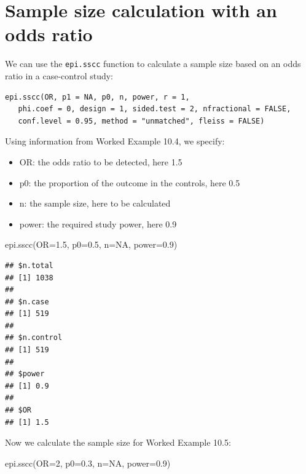 \documentclass[
]{memoir}
\newenvironment{Shaded}{\begin{snugshade}}{\end{snugshade}}
\newcommand{\AttributeTok}[1]{\textcolor[rgb]{0.77,0.63,0.00}{#1}}
\newcommand{\ConstantTok}[1]{\textcolor[rgb]{0.00,0.00,0.00}{#1}}
\newcommand{\DecValTok}[1]{\textcolor[rgb]{0.00,0.00,0.81}{#1}}
\newcommand{\FloatTok}[1]{\textcolor[rgb]{0.00,0.00,0.81}{#1}}
\newcommand{\FunctionTok}[1]{\textcolor[rgb]{0.00,0.00,0.00}{#1}}
\newcommand{\NormalTok}[1]{#1}
\providecommand{\tightlist}{%
  \setlength{\itemsep}{0pt}\setlength{\parskip}{0pt}}
\begin{document}
\hypertarget{sample-size-calculation-with-an-odds-ratio}{%
\section{Sample size calculation with an odds ratio}\label{sample-size-calculation-with-an-odds-ratio}}

We can use the \texttt{epi.sscc} function to calculate a sample size based on an odds ratio in a case-control study:

\begin{verbatim}
epi.sscc(OR, p1 = NA, p0, n, power, r = 1, 
   phi.coef = 0, design = 1, sided.test = 2, nfractional = FALSE, 
   conf.level = 0.95, method = "unmatched", fleiss = FALSE)
\end{verbatim}

Using information from Worked Example 10.4, we specify:

\begin{itemize}
\tightlist
\item
  OR: the odds ratio to be detected, here 1.5
\item
  p0: the proportion of the outcome in the controls, here 0.5
\item
  n: the sample size, here to be calculated
\item
  power: the required study power, here 0.9
\end{itemize}

\begin{Shaded}
\begin{Highlighting}[]
\FunctionTok{epi.sscc}\NormalTok{(}\AttributeTok{OR=}\FloatTok{1.5}\NormalTok{, }\AttributeTok{p0=}\FloatTok{0.5}\NormalTok{, }\AttributeTok{n=}\ConstantTok{NA}\NormalTok{, }\AttributeTok{power=}\FloatTok{0.9}\NormalTok{)}
\end{Highlighting}
\end{Shaded}

\begin{verbatim}
## $n.total
## [1] 1038
## 
## $n.case
## [1] 519
## 
## $n.control
## [1] 519
## 
## $power
## [1] 0.9
## 
## $OR
## [1] 1.5
\end{verbatim}

Now we calculate the sample size for Worked Example 10.5:

\begin{Shaded}
\begin{Highlighting}[]
\FunctionTok{epi.sscc}\NormalTok{(}\AttributeTok{OR=}\DecValTok{2}\NormalTok{, }\AttributeTok{p0=}\FloatTok{0.3}\NormalTok{, }\AttributeTok{n=}\ConstantTok{NA}\NormalTok{, }\AttributeTok{power=}\FloatTok{0.9}\NormalTok{)}
\end{Highlighting}
\end{Shaded}
\end{document}
